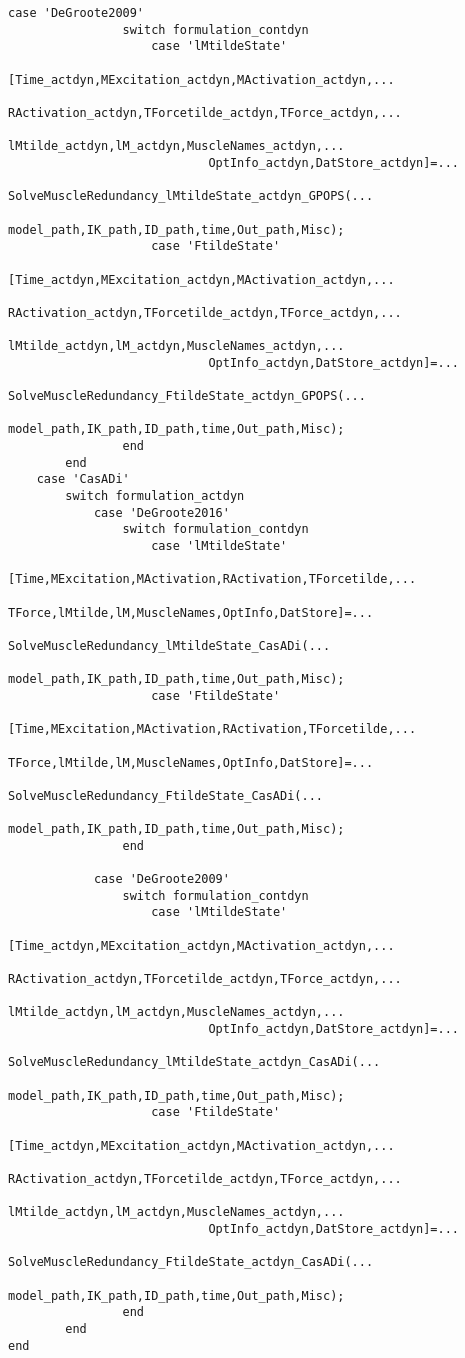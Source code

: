 \documentclass[a4paper,oneside,11pt]{article}
\begin{document}
\begin{lstlisting}[frame=none,basicstyle=\tiny]
            case 'DeGroote2009' 
                switch formulation_contdyn
                    case 'lMtildeState'
                        [Time_actdyn,MExcitation_actdyn,MActivation_actdyn,...
                            RActivation_actdyn,TForcetilde_actdyn,TForce_actdyn,...
                            lMtilde_actdyn,lM_actdyn,MuscleNames_actdyn,...
                            OptInfo_actdyn,DatStore_actdyn]=...
                            SolveMuscleRedundancy_lMtildeState_actdyn_GPOPS(...
                            model_path,IK_path,ID_path,time,Out_path,Misc);
                    case 'FtildeState'   
                        [Time_actdyn,MExcitation_actdyn,MActivation_actdyn,...
                            RActivation_actdyn,TForcetilde_actdyn,TForce_actdyn,...
                            lMtilde_actdyn,lM_actdyn,MuscleNames_actdyn,...
                            OptInfo_actdyn,DatStore_actdyn]=...
                            SolveMuscleRedundancy_FtildeState_actdyn_GPOPS(...
                            model_path,IK_path,ID_path,time,Out_path,Misc);
                end
        end
    case 'CasADi'
        switch formulation_actdyn
            case 'DeGroote2016'      
                switch formulation_contdyn
                    case 'lMtildeState'
                        [Time,MExcitation,MActivation,RActivation,TForcetilde,...
                            TForce,lMtilde,lM,MuscleNames,OptInfo,DatStore]=...
                            SolveMuscleRedundancy_lMtildeState_CasADi(...
                            model_path,IK_path,ID_path,time,Out_path,Misc);
                    case 'FtildeState'   
                        [Time,MExcitation,MActivation,RActivation,TForcetilde,...
                            TForce,lMtilde,lM,MuscleNames,OptInfo,DatStore]=...
                            SolveMuscleRedundancy_FtildeState_CasADi(...
                            model_path,IK_path,ID_path,time,Out_path,Misc);
                end

            case 'DeGroote2009'
                switch formulation_contdyn
                    case 'lMtildeState'
                        [Time_actdyn,MExcitation_actdyn,MActivation_actdyn,...
                            RActivation_actdyn,TForcetilde_actdyn,TForce_actdyn,...
                            lMtilde_actdyn,lM_actdyn,MuscleNames_actdyn,...
                            OptInfo_actdyn,DatStore_actdyn]=...
                            SolveMuscleRedundancy_lMtildeState_actdyn_CasADi(...
                            model_path,IK_path,ID_path,time,Out_path,Misc);
                    case 'FtildeState'   
                        [Time_actdyn,MExcitation_actdyn,MActivation_actdyn,...
                            RActivation_actdyn,TForcetilde_actdyn,TForce_actdyn,...
                            lMtilde_actdyn,lM_actdyn,MuscleNames_actdyn,...
                            OptInfo_actdyn,DatStore_actdyn]=...
                            SolveMuscleRedundancy_FtildeState_actdyn_CasADi(...
                            model_path,IK_path,ID_path,time,Out_path,Misc);
                end
        end
end


\end{lstlisting}
\end{document}
